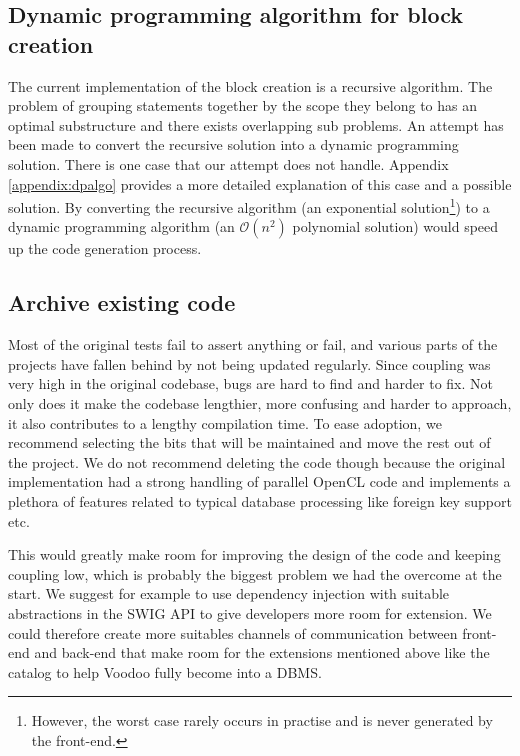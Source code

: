 \subsection{Dynamic programming algorithm for block creation}

The current implementation of the block creation is a recursive algorithm. The problem of grouping statements together by the scope they belong to has an optimal substructure and there exists overlapping sub problems. An attempt has been made to convert the recursive solution into a dynamic programming solution. There is one case that our attempt does not handle. Appendix \ref{appendix:dpalgo} provides a more detailed explanation of this case and a possible solution. By converting the recursive algorithm (an exponential solution\footnote{However, the worst case rarely occurs in practise and is never generated by the front-end.}) to a dynamic programming algorithm (an $\mathcal{O}(n^2)$ polynomial solution) would speed up the code generation process.

\subsection{Archive existing code}

Most of the original tests fail to assert anything or fail, and various parts of the projects have fallen behind by not being updated regularly. Since coupling was very high in the original codebase, bugs are hard to find and harder to fix. Not only does it make the codebase lengthier, more confusing and harder to approach, it also contributes to a lengthy compilation time. To ease adoption, we recommend selecting the bits that will be maintained and move the rest out of the project. We do not recommend deleting the code though because the original implementation had a strong handling of parallel OpenCL code and implements a plethora of features related to typical database processing like foreign key support etc.

This would greatly make room for improving the design of the code and keeping coupling low, which is probably the biggest problem we had the overcome at the start. We suggest for example to use dependency injection with suitable abstractions in the SWIG API to give developers more room for extension. We could therefore create more suitables channels of communication between front-end and back-end that make room for the extensions mentioned above like the catalog to help Voodoo fully become into a DBMS.